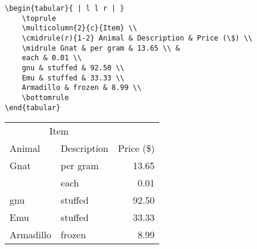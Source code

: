 %
\begin{verbatim}
\begin{tabular}{ | l l r | }
	\toprule
	\multicolumn{2}{c}{Item} \\
	\cmidrule(r){1-2} Animal & Description & Price (\$) \\
	\midrule Gnat & per gram & 13.65 \\ &
	each & 0.01 \\
	gnu & stuffed & 92.50 \\
	Emu & stuffed & 33.33 \\
	Armadillo & frozen & 8.99 \\
	\bottomrule
\end{tabular}
\end{verbatim}

\begin{tabular}{ | l l r | }
	\toprule
	\multicolumn{2}{c}{Item} \\
	\cmidrule(r){1-2} Animal & Description & Price (\$) \\
	\midrule Gnat & per gram & 13.65 \\ &
	each & 0.01 \\
	gnu & stuffed & 92.50 \\
	Emu & stuffed & 33.33 \\
	Armadillo & frozen & 8.99 \\
	\bottomrule
\end{tabular}
%
